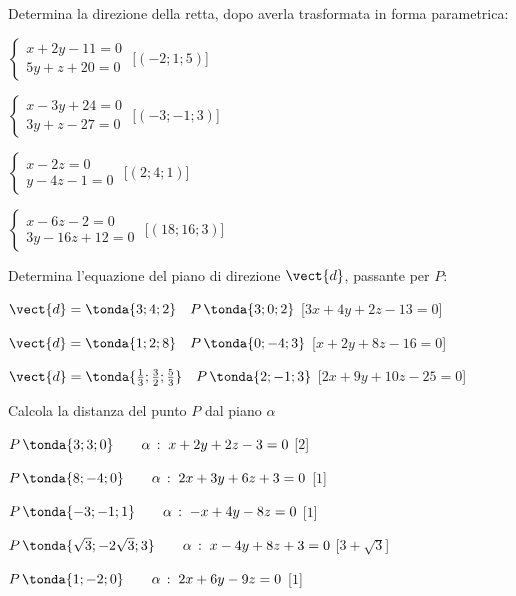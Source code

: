 \begin{esercizio}
Determina la direzione della retta, dopo averla trasformata in forma parametrica:
\begin{multicols}{2}
 \begin{enumeratea}
  \item  \(\begin{cases}
x+2y-11=0 \\
5y+z+20=0
\end{cases}\)    \hfill [\((-2;1;5)\)]
\item\(\begin{cases}
x-3y+24=0 \\
3y+z-27=0
\end{cases}\)    \hfill [\((-3;-1;3)\)]
\item\(\begin{cases}
x-2z=0 \\
y-4z-1=0
\end{cases}\)    \hfill [\((2;4;1)\)]
\item\(\begin{cases}
x-6z-2=0 \\
3y-16z+12=0
\end{cases}\)    \hfill [\((18;16;3)\)]
 \end{enumeratea}
 \end{multicols}
\end{esercizio}

\begin{esercizio}
Determina l'equazione del piano di direzione $\vect{d}$, passante per $P$:
 \begin{enumeratea}
  \item  \(\vect{d} = \tonda{3;4;2} \quad P\,\tonda{3;0;2}\)    \hfill [\(3x+4y+2z-13=0\)]
  \item  \(\vect{d} = \tonda{1;2;8} \quad P\,\tonda{0;-4;3}\)    \hfill [\(x+2y+8z-16=0\)]
  \item  \(\vect{d} = \tonda{\frac{1}{3};\frac{3}{2};\frac{5}{3}} \quad P\,\tonda{2;-1;3}\)    \hfill [\(2x+9y+10z-25=0\)]
 \end{enumeratea}
\end{esercizio}

\begin{esercizio}
Calcola la distanza del punto $P$ dal piano $\alpha$
 \begin{enumeratea}
  \item  \(P\,\tonda{3;3;0} \qquad \alpha\,:\;x+2y+2z-3=0\)    \hfill [\(2\)]
  \item  \(P\,\tonda{8;-4;0} \qquad \alpha\,:\;2x+3y+6z+3=0\)    \hfill [\(1\)]
  \item  \(P\,\tonda{-3;-1;1} \qquad \alpha\,:\;-x+4y-8z=0\)    \hfill [\(1\)]
  \item  \(P\,\tonda{\sqrt{3};-2\sqrt{3};3} \qquad \alpha\,:\;x-4y+8z+3=0\)    \hfill [\(3+\sqrt{3}\)]
  \item  \(P\,\tonda{1;-2;0} \qquad \alpha\,:\;2x+6y-9z=0\)    \hfill [\(1\)]
 \end{enumeratea}
\end{esercizio}


